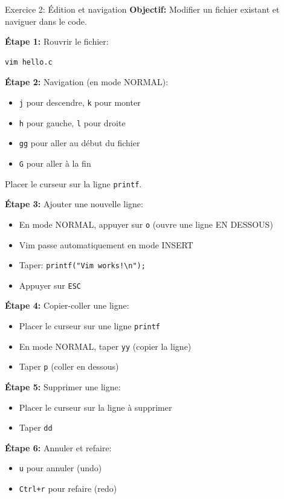 \documentclass[10pt,a4paper]{article}
\begin{document}
\begin{exercicebox}{Exercice 2: Édition et navigation}
\textbf{Objectif:} Modifier un fichier existant et naviguer dans le code.

\textbf{Étape 1:} Rouvrir le fichier:
\begin{verbatim}
vim hello.c
\end{verbatim}

\textbf{Étape 2:} Navigation (en mode NORMAL):
\begin{itemize}
\item \texttt{j} pour descendre, \texttt{k} pour monter
\item \texttt{h} pour gauche, \texttt{l} pour droite
\item \texttt{gg} pour aller au début du fichier
\item \texttt{G} pour aller à la fin
\end{itemize}

Placer le curseur sur la ligne \texttt{printf}.

\textbf{Étape 3:} Ajouter une nouvelle ligne:
\begin{itemize}
\item En mode NORMAL, appuyer sur \texttt{o} (ouvre une ligne EN DESSOUS)
\item Vim passe automatiquement en mode INSERT
\item Taper: \texttt{printf("Vim works!{\textbackslash}n");}
\item Appuyer sur \texttt{ESC}
\end{itemize}

\textbf{Étape 4:} Copier-coller une ligne:
\begin{itemize}
\item Placer le curseur sur une ligne \texttt{printf}
\item En mode NORMAL, taper \texttt{yy} (copier la ligne)
\item Taper \texttt{p} (coller en dessous)
\end{itemize}

\textbf{Étape 5:} Supprimer une ligne:
\begin{itemize}
\item Placer le curseur sur la ligne à supprimer
\item Taper \texttt{dd}
\end{itemize}

\textbf{Étape 6:} Annuler et refaire:
\begin{itemize}
\item \texttt{u} pour annuler (undo)
\item \texttt{Ctrl+r} pour refaire (redo)
\end{itemize}


\end{exercicebox}
\end{document}
